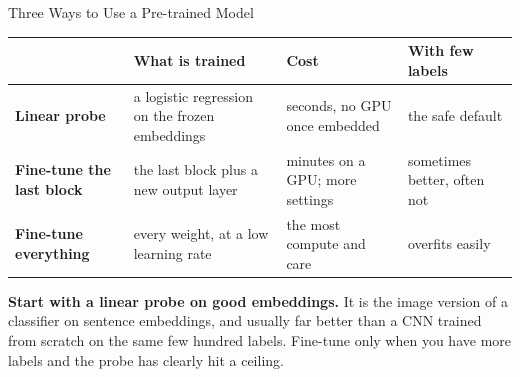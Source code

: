 \begin{frame}{Three Ways to Use a Pre-trained Model}
\vspace{0.1cm}
{\footnotesize
\begin{tabular}{@{}>{\raggedright\arraybackslash}p{3.0cm}>{\raggedright\arraybackslash}p{3.5cm}>{\raggedright\arraybackslash}p{3.0cm}>{\raggedright\arraybackslash}p{3.0cm}@{}}
\toprule
& \textbf{What is trained} & \textbf{Cost} & \textbf{With few labels} \\
\midrule
\textbf{Linear probe} & a logistic regression on the frozen embeddings & seconds, no GPU once embedded & the safe default \\[3pt]
\textbf{Fine-tune the last block} & the last block plus a new output layer & minutes on a GPU; more settings & sometimes better, often not \\[3pt]
\textbf{Fine-tune everything} & every weight, at a low learning rate & the most compute and care & overfits easily \\
\bottomrule
\end{tabular}}

\vspace{0.35cm}
\begin{greenbox}
\textbf{Start with a linear probe on good embeddings.} It is the image version of a classifier on
sentence embeddings, and usually far better than a CNN trained from scratch on the same few hundred
labels. Fine-tune only when you have more labels and the probe has clearly hit a ceiling.
\end{greenbox}
\end{frame}

